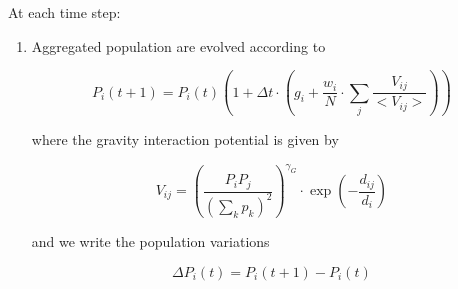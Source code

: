 \documentclass[11pt]{article}
\begin{document}
At each time step:

\begin{enumerate}
	\item Aggregated population are evolved according to
	
	\begin{equation}
		P_i(t+1) = P_i(t) \left(1 + \Delta t \cdot \left(g_i + \frac{w_i}{N} \cdot \sum_j \frac{V_{ij}}{<V_{ij}>} \right) \right)
	\end{equation}
	
	where the gravity interaction potential is given by 
	
	\begin{equation}
		V_{ij} = \left(\frac{P_i P_j}{(\sum_k p_k)^2}\right)^{\gamma_G} \cdot \exp \left(- \frac{d_{ij}}{d_i} \right)
	\end{equation}

	and we write the population variations
	
	\begin{equation}
		\Delta P_i (t) = P_i (t + 1) - P_i (t)
	\end{equation}


\end{enumerate}
\end{document}
